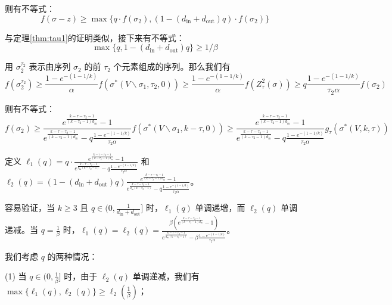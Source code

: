 则有不等式：
\begin{equation}
f(\sigma-z)\ge \max\{ q \cdot f(\sigma_2),(1-(d_{\text{in}} + d_{\text{out}})q) \cdot f(\sigma_2)\} \label{equ:tau2_ine1}
\end{equation}

与定理\ref{thm:tau1}的证明类似，接下来有不等式：
\begin{equation}
    \max\{q,1-(d_{\text{in}} + d_{\text{out}})q\} \ge 1/\beta
\end{equation}

用 $\sigma_2^{\tau_2}$ 表示由序列 $\sigma_2$ 的前 $\tau_2$ 个元素组成的序列。那么我们有
\begin{equation}
f(\sigma_2^{\tau_2}) \ge \frac{1-e^{-(1-1/k)}}{\alpha} f(\sigma^*(V\backslash \sigma_1,\tau_2,0)) \ge  \frac{1-e^{-(1-1/k)}}{\alpha} f(Z_\tau^2(\sigma)) \ge q \frac{1-e^{-(1-1/k)}}{\tau_2 \alpha} f(\sigma_2)
\end{equation}

则有不等式：
\begin{equation}
f(\sigma_2) \ge \frac{e^{\frac{k-\tau-\tau_2-1}{(k-\tau_2-1)d_{\text{in}}}}-1}{e^{\frac{k-\tau-\tau_2-1}{(k-\tau_2-1)d_{\text{in}}}}- q \frac{1-e^{-(1-1/k)}}{\tau_2\alpha} } f(\sigma^*(V\backslash \sigma_1,k-\tau,0)) \ge \frac{e^{\frac{k-\tau-\tau_2-1}{(k-\tau_2-1)d_{\text{in}}}}-1}{e^{\frac{k-\tau-\tau_2-1}{(k-\tau_2-1)d_{\text{in}}}}- q \frac{1-e^{-(1-1/k)}}{\tau_2\alpha} } g_\tau(\sigma^*(V,k,\tau)) \label{equ:tau2_ine3}
\end{equation}

定义 $\ell_1(q) = q \cdot \frac{e^{\frac{k-\tau-\tau_2-1}{(k-\tau_2-1)d_{\text{in}}}}-1}{e^{\frac{k-\tau-\tau_2-1}
{d_{\text{in}}(k-\tau_2-1)}}-q \frac{1-e^{-(1-1/k)}}{\tau_2\alpha} }$ 和 $\ell_2(q) = (1-(d_{\text{in}} + d_{\text{out}})q) \frac{e^{\frac{k-\tau-\tau_2-1}{(k-\tau_2-1)d_{\text{in}}}}-1}{e^{\frac{k-\tau-\tau_2-1}
{d_{\text{in}}(k-\tau_2-1)}}-q \frac{1-e^{-(1-1/k)}}{\tau_2\alpha} }$。

容易验证，当 $k\ge 3$ 且 $q\in (0,\frac{1}{d_{\text{in}}+d_{\text{out}}}]$ 时，$\ell_1(q)$ 单调递增，而 $\ell_2(q)$ 单调递减。当 $q=\frac{1}{\beta}$ 时，$\ell_1(q)=\ell_2(q)=\frac{\beta(e^{\frac{k-\tau-\tau_2-1}{(k-\tau_2-1)d_{\text{in}}}}-1)}{e^{\frac{k-\tau-\tau_2-1}
{d_{\text{in}}(k-\tau_2-1)}}-\beta \frac{1-e^{-(1-1/k)}}{\tau_2\alpha} }$。

我们考虑 $q$ 的两种情况：

(1) 当 $q \in (0,\frac{1}{\beta}]$ 时，由于 $\ell_2(q)$ 单调递减，我们有 $\max\{\ell_1(q),\ell_2(q)\}\ge \ell_2(\frac{1}{\beta})$；

